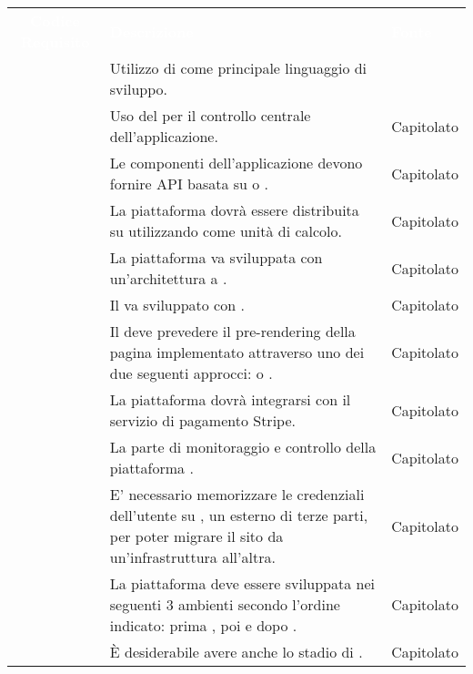 \renewcommand{\arraystretch}{1.5}
\begin{longtable}{|c C{9.5cm} C{2.5cm}|} 
	
	\textcolor{white}{\textbf{Codice Requisito}}&
	\textcolor{white}{\textbf{Descrizione}}&
	\textcolor{white}{\textbf{Fonte}}\\
	 & Utilizzo di  come principale linguaggio di sviluppo. &  \\
	
	 & Uso del   per il controllo centrale dell'applicazione. & Capitolato \\
	
	 & Le componenti dell'applicazione devono fornire API basata su  o . & Capitolato \\
	
	 & La piattaforma dovrà essere distribuita su  utilizzando  come unità di calcolo. & Capitolato \\
	
	 & La piattaforma va sviluppata con un'architettura a . & Capitolato \\
	
	 & Il  va sviluppato con . & Capitolato \\
	
	 & Il  deve prevedere il pre-rendering della pagina  implementato attraverso uno dei due seguenti approcci:  o . & Capitolato \\
	
	 & La piattaforma dovrà integrarsi con il servizio di pagamento Stripe. & Capitolato \\
	
	 & La parte di monitoraggio e controllo della piattaforma . & Capitolato \\
	
	 & E' necessario memorizzare le credenziali dell'utente su , un  esterno di terze parti, per poter migrare il sito da un'infrastruttura all'altra. & Capitolato \\
	
	 & La piattaforma deve essere sviluppata nei seguenti 3 ambienti secondo l'ordine indicato: prima , poi  e dopo . & Capitolato \\
	
	 & È desiderabile avere anche lo stadio di . & Capitolato \\
\end{longtable}
